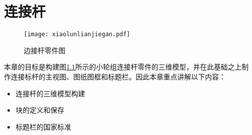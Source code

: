 \chapter{连接杆}
\begin{figure}[htbp]
\centering
\texttt{[image: xiaolunlianjiegan.pdf]}
\caption{边接杆零件图}\label{fig:xiaolunlianjiegan}
\end{figure}

本章的目标是构建图\ref{fig:xiaolunlianjiegan}所示的小轮组连接杆零件的三维模型，并在此基础之上制作连接标杆的主视图、图纸图框和标题栏。因此本章重点讲解以下内容：
\begin{itemize}
\item 连接杆的三维模型构建
\item 块的定义和保存
\item 标题栏的国家标准
\end{itemize}





\endinput